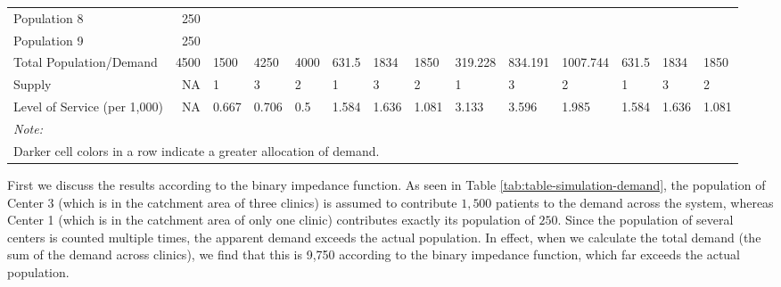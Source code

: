 \documentclass[10pt,letterpaper]{article}
\begin{document}
\begin{landscape}
\begin{table}[t]
\begin{tabular}{lrllllllllllll}
Population 8 & 250 & \cellcolor[HTML]{FCA636}{\textcolor{black}{0}} & \cellcolor[HTML]{0D0887}{\textcolor{black}{250}} & \cellcolor[HTML]{0D0887}{\textcolor{black}{250}} & \cellcolor[HTML]{FCA636}{\textcolor{black}{0}} & \cellcolor[HTML]{9714A1}{\textcolor{black}{150}} & \cellcolor[HTML]{E26561}{\textcolor{black}{60.5}} & \cellcolor[HTML]{FCA636}{\textcolor{black}{0}} & \cellcolor[HTML]{C13B82}{\textcolor{black}{106.89}} & \cellcolor[HTML]{F79242}{\textcolor{black}{17.388}} & \cellcolor[HTML]{FCA636}{\textcolor{black}{0}} & \cellcolor[HTML]{9714A1}{\textcolor{black}{150}} & \cellcolor[HTML]{E26561}{\textcolor{black}{60.5}}\\
Population 9 & 250 & \cellcolor[HTML]{FCA636}{\textcolor{black}{0}} & \cellcolor[HTML]{0D0887}{\textcolor{black}{250}} & \cellcolor[HTML]{0D0887}{\textcolor{black}{250}} & \cellcolor[HTML]{FCA636}{\textcolor{black}{0}} & \cellcolor[HTML]{E26561}{\textcolor{black}{60.5}} & \cellcolor[HTML]{E26561}{\textcolor{black}{60.5}} & \cellcolor[HTML]{FCA636}{\textcolor{black}{0}} & \cellcolor[HTML]{F2844B}{\textcolor{black}{30.25}} & \cellcolor[HTML]{F2844B}{\textcolor{black}{30.25}} & \cellcolor[HTML]{FCA636}{\textcolor{black}{0}} & \cellcolor[HTML]{E26561}{\textcolor{black}{60.5}} & \cellcolor[HTML]{E26561}{\textcolor{black}{60.5}}\\
Total Population/Demand & 4500 & 1500 & 4250 & 4000 & 631.5 & 1834 & 1850 & 319.228 & 834.191 & 1007.744 & 631.5 & 1834 & 1850\\
\addlinespace
Supply & NA & 1 & 3 & 2 & 1 & 3 & 2 & 1 & 3 & 2 & 1 & 3 & 2\\
Level of Service (per 1,000) & NA & 0.667 & 0.706 & 0.5 & 1.584 & 1.636 & 1.081 & 3.133 & 3.596 & 1.985 & 1.584 & 1.636 & 1.081\\
\bottomrule
\multicolumn{14}{l}{\textit{Note: }}\\
\multicolumn{14}{l}{Darker cell colors in a row indicate a greater allocation of demand. }\\
\end{tabular}
\end{table}
\end{landscape}

First we discuss the results according to the binary impedance function.
As seen in Table \ref{tab:table-simulation-demand}, the population of
Center 3 (which is in the catchment area of three clinics) is assumed to
contribute \(1,500\) patients to the demand across the system, whereas
Center 1 (which is in the catchment area of only one clinic) contributes
exactly its population of \(250\). Since the population of several
centers is counted multiple times, the apparent demand exceeds the
actual population. In effect, when we calculate the total demand (the
sum of the demand across clinics), we find that this is 9,750 according
to the binary impedance function, which far exceeds the actual
population.
\end{document}
